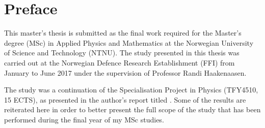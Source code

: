 \chapter*{Preface}%
%
This master's thesis is submitted as the final work required for the Master's degree (MSc) in Applied Physics and Mathematics at the Norwegian University of Science and Technology (NTNU). The study presented in this thesis was carried out at the Norwegian Defence Research Establishment (FFI) from January to June 2017 under the supervision of Professor Randi Haakenaasen. 

The study was a continuation of the Specialisation Project in Physics (TFY4510, 15 ECTS), as presented in the author's report titled  \citep{lauten2017characterisation}. Some of the results are reiterated here in order to better present the full scope of the study that has been performed during the final year of my MSc studies. %

